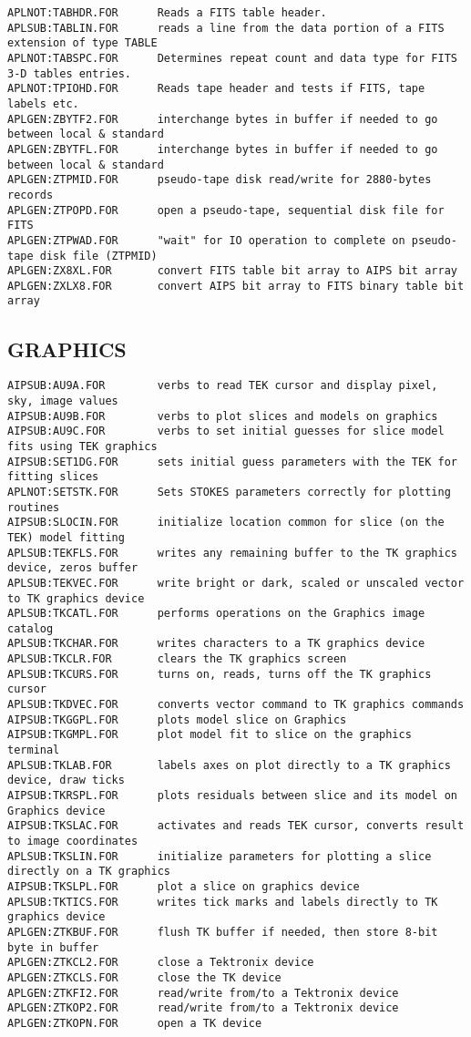 \begin{verbatim}
APLNOT:TABHDR.FOR      Reads a FITS table header.
APLSUB:TABLIN.FOR      reads a line from the data portion of a FITS extension of type TABLE
APLNOT:TABSPC.FOR      Determines repeat count and data type for FITS 3-D tables entries.
APLNOT:TPIOHD.FOR      Reads tape header and tests if FITS, tape labels etc.
APLGEN:ZBYTF2.FOR      interchange bytes in buffer if needed to go between local & standard
APLGEN:ZBYTFL.FOR      interchange bytes in buffer if needed to go between local & standard
APLGEN:ZTPMID.FOR      pseudo-tape disk read/write for 2880-bytes records
APLGEN:ZTPOPD.FOR      open a pseudo-tape, sequential disk file for FITS
APLGEN:ZTPWAD.FOR      "wait" for IO operation to complete on pseudo-tape disk file (ZTPMID)
APLGEN:ZX8XL.FOR       convert FITS table bit array to AIPS bit array
APLGEN:ZXLX8.FOR       convert AIPS bit array to FITS binary table bit array
\end{verbatim}
 
\subsection{GRAPHICS}
\begin{verbatim}
AIPSUB:AU9A.FOR        verbs to read TEK cursor and display pixel, sky, image values
AIPSUB:AU9B.FOR        verbs to plot slices and models on graphics
AIPSUB:AU9C.FOR        verbs to set initial guesses for slice model fits using TEK graphics
AIPSUB:SET1DG.FOR      sets initial guess parameters with the TEK for fitting slices
APLNOT:SETSTK.FOR      Sets STOKES parameters correctly for plotting routines
AIPSUB:SLOCIN.FOR      initialize location common for slice (on the TEK) model fitting
APLSUB:TEKFLS.FOR      writes any remaining buffer to the TK graphics device, zeros buffer
APLSUB:TEKVEC.FOR      write bright or dark, scaled or unscaled vector to TK graphics device
APLSUB:TKCATL.FOR      performs operations on the Graphics image catalog
APLSUB:TKCHAR.FOR      writes characters to a TK graphics device
APLSUB:TKCLR.FOR       clears the TK graphics screen
APLSUB:TKCURS.FOR      turns on, reads, turns off the TK graphics cursor
APLSUB:TKDVEC.FOR      converts vector command to TK graphics commands
AIPSUB:TKGGPL.FOR      plots model slice on Graphics
AIPSUB:TKGMPL.FOR      plot model fit to slice on the graphics terminal
APLSUB:TKLAB.FOR       labels axes on plot directly to a TK graphics device, draw ticks
AIPSUB:TKRSPL.FOR      plots residuals between slice and its model on Graphics device
AIPSUB:TKSLAC.FOR      activates and reads TEK cursor, converts result to image coordinates
APLSUB:TKSLIN.FOR      initialize parameters for plotting a slice directly on a TK graphics
AIPSUB:TKSLPL.FOR      plot a slice on graphics device
APLSUB:TKTICS.FOR      writes tick marks and labels directly to TK graphics device
APLGEN:ZTKBUF.FOR      flush TK buffer if needed, then store 8-bit byte in buffer
APLGEN:ZTKCL2.FOR      close a Tektronix device
APLGEN:ZTKCLS.FOR      close the TK device
APLGEN:ZTKFI2.FOR      read/write from/to a Tektronix device
APLGEN:ZTKOP2.FOR      read/write from/to a Tektronix device
APLGEN:ZTKOPN.FOR      open a TK device
\end{verbatim}
 
